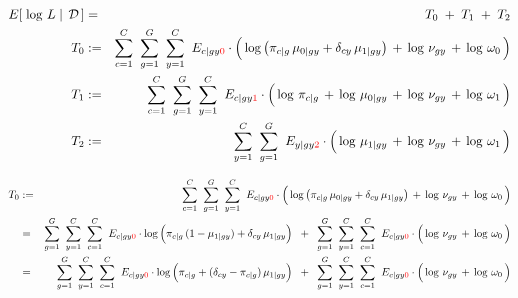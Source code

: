 \begin{eqnarray*}
E\!\left[\,\left.\log\,L\;\right\vert\;\mathcal{D}\,\right]
&=& T_{0} \;+\; T_{1} \;+\; T_{2}
\\
T_{0}
&:=&
	\overset{C}{\underset{c=1}{\sum}}\;\;
	\overset{G}{\underset{g=1}{\sum}}\;\;
	\overset{C}{\underset{y=1}{\sum}}\;\;
	E_{c \vert gy{\color{red}0}}
	\cdot
	\left(\,
		\log\left(\pi_{c \vert g}\,\mu_{0 \vert gy} + \delta_{cy}\,\mu_{1\vert gy}\right)
		\,\overset{{\color{white}.}}{+}\,
		\log\,\nu_{gy}
		\,\overset{{\color{white}.}}{+}\,
		\log\,\omega_{0}
	\,\right)
\\
T_{1}
&:=&
	\overset{C}{\underset{c=1}{\sum}}\;\;
	\overset{G}{\underset{g=1}{\sum}}\;\;
	\overset{C}{\underset{y=1}{\sum}}\;\;
	E_{c \vert gy{\color{red}1}}
	\cdot
	\left(\,
		\log\,\pi_{c \vert g}
		\,\overset{{\color{white}.}}{+}\,
		\log\,\mu_{0\vert gy}
		\,\overset{{\color{white}.}}{+}\,
		\log\,\nu_{gy}
		\,\overset{{\color{white}.}}{+}\,
		\log\,\omega_{1}
	\,\right)
\\
T_{2}
&:=&
	\overset{C}{\underset{y=1}{\sum}}\;\;
	\overset{G}{\underset{g=1}{\sum}}\;\;
	E_{y \vert gy{\color{red}2}}
	\cdot
	\left(\,
		\log\,\mu_{1 \vert gy}
		\,\overset{{\color{white}.}}{+}\,
		\log\,\nu_{gy}
		\,\overset{{\color{white}.}}{+}\,
		\log\,\omega_{1}
	\,\right)
\end{eqnarray*}

\begin{eqnarray*}
T_{0}
&:=&
	\overset{C}{\underset{c=1}{\sum}}\;\;
	\overset{G}{\underset{g=1}{\sum}}\;\;
	\overset{C}{\underset{y=1}{\sum}}\;\;
	E_{c \vert gy{\color{red}0}}
	\cdot
	\left(\,
		\log\left(\pi_{c \vert g}\,\mu_{0 \vert gy} + \delta_{cy}\,\mu_{1\vert gy}\right)
		\,\overset{{\color{white}.}}{+}\,
		\log\,\nu_{gy}
		\,\overset{{\color{white}.}}{+}\,
		\log\,\omega_{0}
	\,\right)
\\
&=&
	\overset{G}{\underset{g=1}{\sum}}\;\;
	\overset{C}{\underset{y=1}{\sum}}\;\;
	\overset{C}{\underset{c=1}{\sum}}\;\;
	E_{c \vert gy{\color{red}0}}
	\cdot
	\log\left(\pi_{c \vert g}\,(1-\mu_{1 \vert gy}) \overset{{\color{white}.}}{+} \delta_{cy}\,\mu_{1\vert gy}\right)
	\;\; + \;\;
	\overset{G}{\underset{g=1}{\sum}}\;\;
	\overset{C}{\underset{y=1}{\sum}}\;\;
	\overset{C}{\underset{c=1}{\sum}}\;\;
	E_{c \vert gy{\color{red}0}}
	\cdot
	\left(\,
		\log\,\nu_{gy}
		\,\overset{{\color{white}.}}{+}\,
		\log\,\omega_{0}
	\,\right)	
\\
&=&
	\overset{G}{\underset{g=1}{\sum}}\;\;
	\overset{C}{\underset{y=1}{\sum}}\;\;
	\overset{C}{\underset{c=1}{\sum}}\;\;
	E_{c \vert gy{\color{red}0}}
	\cdot
	\log\left(\pi_{c \vert g} \overset{{\color{white}.}}{+} (\delta_{cy}-\pi_{c \vert g})\,\mu_{1\vert gy}\right)
	\;\; + \;\;
	\overset{G}{\underset{g=1}{\sum}}\;\;
	\overset{C}{\underset{y=1}{\sum}}\;\;
	\overset{C}{\underset{c=1}{\sum}}\;\;
	E_{c \vert gy{\color{red}0}}
	\cdot
	\left(\,
		\log\,\nu_{gy}
		\,\overset{{\color{white}.}}{+}\,
		\log\,\omega_{0}
	\,\right)	
\end{eqnarray*}

